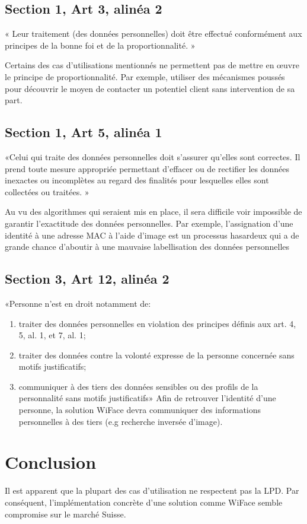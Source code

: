 \subsection{Section 1, Art 3, alinéa 2}
« Leur traitement (des données personnelles) doit être effectué conformément aux principes de la bonne foi et de
la proportionnalité. »

Certains des cas d’utilisations mentionnés ne permettent pas de mettre en œuvre le principe de proportionnalité.
Par exemple, utiliser des mécanismes poussés pour découvrir le moyen de contacter un potentiel client sans
intervention de sa part.

\subsection{Section 1, Art 5, alinéa 1}
«Celui qui traite des données personnelles doit s’assurer qu’elles sont correctes. Il prend toute mesure appropriée
permettant d’effacer ou de rectifier les données inexactes ou incomplètes au regard des finalités pour lesquelles
elles sont collectées ou traitées. »

Au vu des algorithmes qui seraient mis en place, il sera difficile voir impossible de garantir l’exactitude des données
personnelles. Par exemple, l’assignation d’une identité à une adresse MAC à l’aide d’image est un processus
hasardeux qui a de grande chance d’aboutir à une mauvaise labellisation des données personnelles

\subsection{Section 3, Art 12, alinéa 2}
«Personne n’est en droit notamment de:
\begin{enumerate}[label=\alph*]
\item traiter des données personnelles en violation des principes définis aux art. 4, 5, al. 1, et 7, al. 1;
\item traiter des données contre la volonté expresse de la personne concernée sans motifs justificatifs;
\item communiquer à des tiers des données sensibles ou des profils de la personnalité sans motifs justificatifs»
Afin de retrouver l’identité d’une personne, la solution WiFace devra communiquer des informations personnelles
à des tiers (e.g recherche inversée d’image).
\end{enumerate}

\section{Conclusion}
Il est apparent que la plupart des cas d’utilisation ne respectent pas la LPD. Par conséquent, l’implémentation
concrète d’une solution comme WiFace semble compromise sur le marché Suisse.



